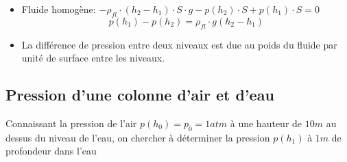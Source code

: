 \documentclass[
    11pt,
    a4paper,
    oneside,
    headinlcude, footinclude,
    twoside,
]{report}
\begin{document}
\begin{itemize}
    \item Fluide homogène: $- \rho_{fl} \cdot (h_{2} - h_{1})\cdot S \cdot g -
        p(h_{2}) \cdot S + p(h_{1}) \cdot S = 0$
        \begin{equation}
            p(h_{1}) - p(h_{2}) = \rho_{fl} \cdot g ( h_{2} - h_{1} )
        \end{equation}
    \item La différence de pression entre deux niveaux est due au poids du
        fluide par unité de surface entre les niveaux.
\end{itemize}

\subsection{Pression d'une colonne d'air et d'eau}
\label{sub:pression_d_une_colonne_d_air_et_d_eau}

Connaissant la pression de l'air $p(h_{0}) = p_{0} = 1 atm$ à une hauteur de $10
m$ au dessus du niveau de l'eau, on chercher à déterminer la pression $p(h_{1})$
à $1 m$ de profondeur dans l'eau
\end{document}
